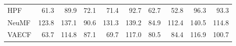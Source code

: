\begin{tabular}{lrrrrrrrrr}
HPF                &                 61.3 &                 89.9 &                  72.1 &                 71.4 &                 92.7 &                  62.7 &                   52.8 &                   96.3 &                    93.3 \\
NeuMF              &                123.8 &                137.1 &                  90.6 &                131.3 &                139.2 &                  84.9 &                  112.4 &                  140.5 &                   114.8 \\
VAECF              &                 63.7 &                114.8 &                  87.1 &                 69.7 &                117.0 &                  80.5 &                   84.4 &                  116.9 &                   100.7 \\
\bottomrule
\end{tabular}
